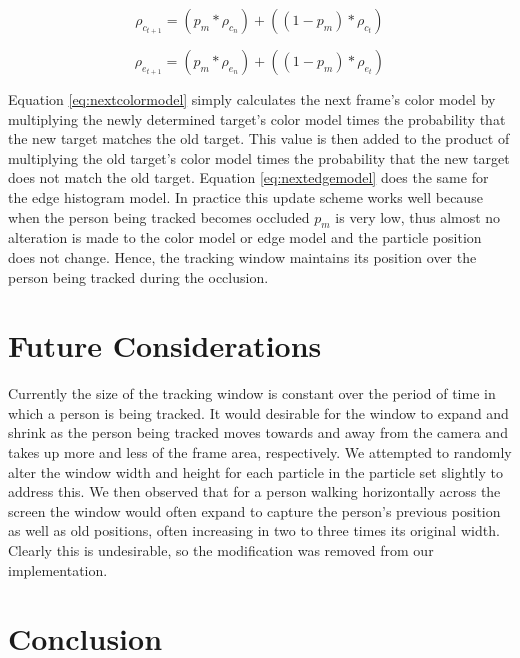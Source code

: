 \documentclass[11pt]{article}
\begin{document}
\begin{equation}
\rho_{c_{t+1}} = (p_m * \rho_{c_{n}}) + ((1-p_m) * \rho_{c_{t}})
\label{eq:nextcolormodel}
\end{equation}

\begin{equation}
\rho_{e_{t+1}} = (p_m * \rho_{e_{n}}) + ((1-p_m) * \rho_{e_{t}})
\label{eq:nextedgemodel}
\end{equation}

Equation \ref{eq:nextcolormodel} simply calculates the next frame's color model by multiplying the newly determined target's color model times the probability that the new target matches the old target. This value is then added to the product of multiplying the old target's color model times the probability that the new target does not match the old target. Equation \ref{eq:nextedgemodel} does the same for the edge histogram model. In practice this update scheme works well because when the person being tracked becomes occluded $p_m$ is very low, thus almost no alteration is made to the color model or edge model and the particle position does not change. Hence, the tracking window maintains its position over the person being tracked during the occlusion.  



\section{Future Considerations}
\label{sec:future}

Currently the size of the tracking window is constant over the period of time in which a person is being tracked. It would desirable for the window to expand and shrink as the person being tracked moves towards and away from the camera and takes up more and less of the frame area, respectively. We attempted to randomly alter the window width and height for each particle in the particle set slightly to address this. We then observed that for a person walking horizontally across the screen the window would often expand to capture the person's previous position as well as old positions, often increasing in two to three times its original width. Clearly this is undesirable, so the modification was removed from our implementation.



\section{Conclusion}
\label{sec:conclusion}


\newpage
\footnotesize


\end{document}
